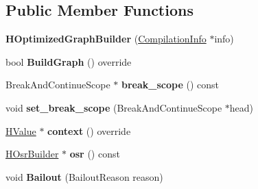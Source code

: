 \subsection*{Public Member Functions}
\begin{DoxyCompactItemize}
\item 
{\bfseries H\+Optimized\+Graph\+Builder} (\hyperlink{classv8_1_1internal_1_1_compilation_info}{Compilation\+Info} $\ast$info)\hypertarget{classv8_1_1internal_1_1_h_optimized_graph_builder_a38e496b79785a0f8e10335ce4280b95c}{}\label{classv8_1_1internal_1_1_h_optimized_graph_builder_a38e496b79785a0f8e10335ce4280b95c}

\item 
bool {\bfseries Build\+Graph} () override\hypertarget{classv8_1_1internal_1_1_h_optimized_graph_builder_aa342688af2cf81a6d07f51ef9e92e980}{}\label{classv8_1_1internal_1_1_h_optimized_graph_builder_aa342688af2cf81a6d07f51ef9e92e980}

\item 
Break\+And\+Continue\+Scope $\ast$ {\bfseries break\+\_\+scope} () const \hypertarget{classv8_1_1internal_1_1_h_optimized_graph_builder_a6480d2f7867f824dd075714f53b64993}{}\label{classv8_1_1internal_1_1_h_optimized_graph_builder_a6480d2f7867f824dd075714f53b64993}

\item 
void {\bfseries set\+\_\+break\+\_\+scope} (Break\+And\+Continue\+Scope $\ast$head)\hypertarget{classv8_1_1internal_1_1_h_optimized_graph_builder_a877c5a683bfcdfa9b40f7e4cb2b68d94}{}\label{classv8_1_1internal_1_1_h_optimized_graph_builder_a877c5a683bfcdfa9b40f7e4cb2b68d94}

\item 
\hyperlink{classv8_1_1internal_1_1_h_value}{H\+Value} $\ast$ {\bfseries context} () override\hypertarget{classv8_1_1internal_1_1_h_optimized_graph_builder_a1a81d8be4413680040f36736f379c08e}{}\label{classv8_1_1internal_1_1_h_optimized_graph_builder_a1a81d8be4413680040f36736f379c08e}

\item 
\hyperlink{classv8_1_1internal_1_1_h_osr_builder}{H\+Osr\+Builder} $\ast$ {\bfseries osr} () const \hypertarget{classv8_1_1internal_1_1_h_optimized_graph_builder_a705239d69f3f4e7720cf1aad0541d2b4}{}\label{classv8_1_1internal_1_1_h_optimized_graph_builder_a705239d69f3f4e7720cf1aad0541d2b4}

\item 
void {\bfseries Bailout} (Bailout\+Reason reason)\hypertarget{classv8_1_1internal_1_1_h_optimized_graph_builder_af98057ce6d5ac2667c0f01c7cab692ed}{}\label{classv8_1_1internal_1_1_h_optimized_graph_builder_af98057ce6d5ac2667c0f01c7cab692ed}


\end{DoxyCompactItemize}

